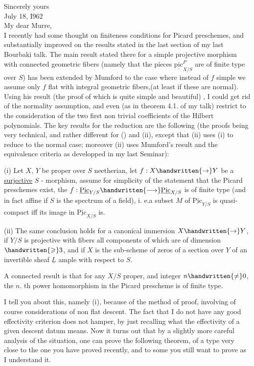 Sincerely yours\\

July 18, I962\\

My dear Murre,\\

I recently had some thought on finiteness conditions for Picard preschemes, and substantially improved on the results stated in the last section of my last Bourbaki talk. The main result stated there for a simple projective morphism with connected geometric fibers (namely that the pieces $\underline{\mathrm{pic}}^{P}_{X/S}$ are of finite type over $S$) has been extended by Mumford to the case where instead of $f$ simple we assume only $f$ flat with integral geometric fibers,(at least if these are normal). Using his result (the proof of which is quite simple and beautiful) , I could get rid of the normality assumption, and even (as in theorem 4.1. of my talk) restrict to the consideration of the two first non trivial coefficients of the Hilbert polynomials. The key results for the reduction are the following (the proofs being very technical, and rather different for () and (ii), except that (ii) uses (i) to reduce to the normal case; moreover (ii) uses Mumford's result and the equivalence criteria as developped in my last Seminar):

(i) Let $X$, $Y$ be proper over $S$ neetherian, let $f:X\handwritten{\to}Y$ be a \uline{surjective} $S$ - morphism, assume for simplicity of the statement that the Picard preschemes exist, the $f:\underline{\mathrm{Pic}}_{Y/S}\handwritten{\longrightarrow}\underline{\mathrm{Pic}}_{X/S}$ is of finite type (and in fact affine if $S$ is the spectrum of a field), i. e.a subset $M$ of $\underline{\mathrm{Pic}}_{Y/S}$ is quasi-compact iff its image in $\underline{\mathrm{Pic}}_{X/S}$ is.

(ii) The same conclusion holds for a canonical immersion $X\handwritten{\to}Y$, if $Y/S$ is projective with fibers all components of which are of dimension $\handwritten{\geqslant}3$, and if $X$ is the sub-scheme of zeros of a section over $Y$ of an invertible sheaf $\underline{L}$ ample with respect to $S$.

A connected result is that for any $X/S$ proper, and integer $n\handwritten{\ne}0$, the $n$. th power homomorphism in the Picard prescheme is of finite type.

I tell you about this, namely (i), because of the method of proof, involving of course considerations of non flat descent. The fact that I do not have any good effectivity criterion does not hamper, by just recalling what the effectivity of a given descent datum means. Now it turns out that by a slightly more careful analysis of the situation, one can prove the following theorem, of a type very close to the one you have proved recently, and to some you still want to prove as I understand it.

